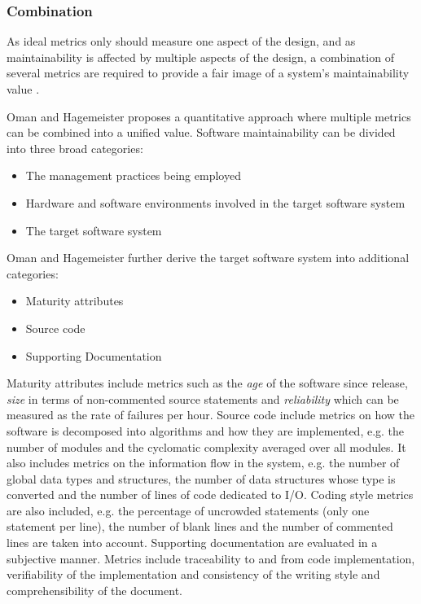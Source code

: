 \subsubsection{Combination}

As ideal metrics only should measure one aspect of the design, and as
maintainability is affected by multiple aspects of the design, a combination of
several metrics are required to provide a fair image of a system's
maintainability value \cite{benestad2006assessing}.

Oman and Hagemeister \cite{oman1992metrics} proposes a quantitative approach
where multiple metrics can be combined into a unified value. Software
maintainability can be divided into three broad categories:

\begin{itemize}
\item The management practices being employed
\item Hardware and software environments involved in the target software system
\item The target software system
\end{itemize}

Oman and Hagemeister further derive the target software system into additional
categories:

\begin{itemize}
\item Maturity attributes
\item Source code
\item Supporting Documentation
\end{itemize}

Maturity attributes include metrics such as the \textit{age} of the software
since release, \textit{size} in terms of non-commented source statements and
\textit{reliability} which can be measured as the rate of failures per hour.
Source code include metrics on how the software is decomposed into algorithms
and how they are implemented, e.g. the number of modules and the cyclomatic
complexity averaged over all modules. It also includes metrics on the
information flow in the system, e.g. the number of global data types and
structures, the number of data structures whose type is converted and the
number of lines of code dedicated to I/O. Coding style metrics are also
included, e.g. the percentage of uncrowded statements (only one statement per
line), the number of blank lines and the number of commented lines are taken
into account. Supporting documentation are evaluated in a subjective manner.
Metrics include traceability to and from code implementation, verifiability of
the implementation and consistency of the writing style and comprehensibility
of the document. \cite{oman1992metrics}

